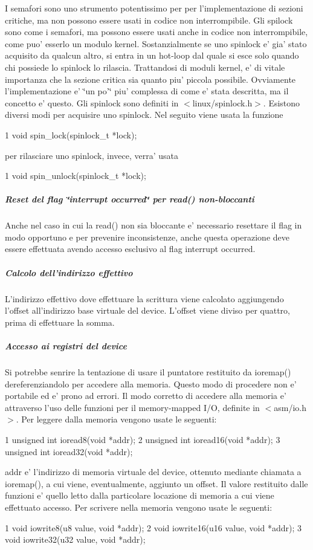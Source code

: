 I semafori sono uno strumento potentissimo per per l'implementazione di sezioni critiche, ma non possono essere usati in codice non interrompibile. Gli spilock sono come i semafori, ma possono essere usati anche in codice non interrompibile, come puo' esserlo un modulo kernel. Sostanzialmente se uno spinlock e' gia' stato acquisito da qualcun altro, si entra in un hot-\/loop dal quale si esce solo quando chi possiede lo spinlock lo rilascia. Trattandosi di moduli kernel, e' di vitale importanza che la sezione critica sia quanto piu' piccola possibile. Ovviamente l'implementazione e' \char`\"{}un po'\char`\"{} piu' complessa di come e' stata descritta, ma il concetto e' questo. Gli spinlock sono definiti in $<$linux/spinlock.\+h$>$. Esistono diversi modi per acquisire uno spinlock. Nel seguito viene usata la funzione 
\begin{DoxyCode}
1 void spin\_lock(spinlock\_t *lock);
\end{DoxyCode}
 per rilasciare uno spinlock, invece, verra' usata 
\begin{DoxyCode}
1 void spin\_unlock(spinlock\_t *lock);
\end{DoxyCode}


\subparagraph*{Reset del flag \char`\"{}interrupt occurred\char`\"{} per read() non-\/bloccanti}

Anche nel caso in cui la read() non sia bloccante e' necessario resettare il flag in modo opportuno e per prevenire inconsistenze, anche questa operazione deve essere effettuata avendo accesso esclusivo al flag interrupt occurred.

\subparagraph*{Calcolo dell'indirizzo effettivo}

L'indirizzo effettivo dove effettuare la scrittura viene calcolato aggiungendo l'offset all'indirizzo base virtuale del device. L'offset viene diviso per quattro, prima di effettuare la somma.

\subparagraph*{Accesso ai registri del device}

Si potrebbe senrire la tentazione di usare il puntatore restituito da ioremap() dereferenziandolo per accedere alla memoria. Questo modo di procedere non e' portabile ed e' prono ad errori. Il modo corretto di accedere alla memoria e' attraverso l'uso delle funzioni per il memory-\/mapped I/\+O, definite in $<$asm/io.\+h$>$. Per leggere dalla memoria vengono usate le seguenti\+: 
\begin{DoxyCode}
1 unsigned int ioread8(void *addr);
2 unsigned int ioread16(void *addr);
3 unsigned int ioread32(void *addr);
\end{DoxyCode}
 addr e' l'indirizzo di memoria virtuale del device, ottenuto mediante chiamata a ioremap(), a cui viene, eventualmente, aggiunto un offset. Il valore restituito dalle funzioni e' quello letto dalla particolare locazione di memoria a cui viene effettuato accesso. Per scrivere nella memoria vengono usate le seguenti\+: 
\begin{DoxyCode}
1 void iowrite8(u8 value, void *addr);
2 void iowrite16(u16 value, void *addr);
3 void iowrite32(u32 value, void *addr);
\end{DoxyCode}



